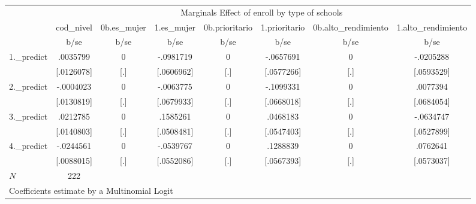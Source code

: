 \begin{tabular}{l*{7}{c}}
            &\multicolumn{7}{c}{Marginals Effect of enroll by type of schools}                         \\
            &   cod\_nivel& 0b.es\_mujer&  1.es\_mujer&0b.prioritario&1.prioritario&0b.alto\_rendimiento&1.alto\_rendimiento\\
            &        b/se&        b/se&        b/se&        b/se&        b/se&        b/se&        b/se\\
1.\_predict  &    .0035799&           0&   -.0981719&           0&   -.0657691&           0&   -.0205288\\
            &  [.0126078]&         [.]&  [.0606962]&         [.]&  [.0577266]&         [.]&  [.0593529]\\
2.\_predict  &   -.0004023&           0&   -.0063775&           0&   -.1099331&           0&    .0077394\\
            &  [.0130819]&         [.]&  [.0679933]&         [.]&  [.0668018]&         [.]&  [.0684054]\\
3.\_predict  &    .0212785&           0&    .1585261&           0&    .0468183&           0&   -.0634747\\
            &  [.0140803]&         [.]&  [.0508481]&         [.]&  [.0547403]&         [.]&  [.0527899]\\
4.\_predict  &   -.0244561&           0&   -.0539767&           0&    .1288839&           0&    .0762641\\
            &  [.0088015]&         [.]&  [.0552086]&         [.]&  [.0567393]&         [.]&  [.0573037]\\
\(N\)       &         222&            &            &            &            &            &            \\
\multicolumn{8}{l}{\footnotesize Coefficients estimate by a Multinomial Logit}\\
\end{tabular}
